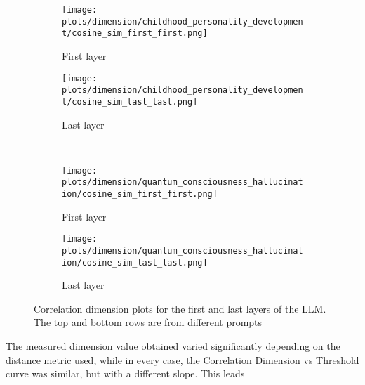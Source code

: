 \documentclass[a4paper,12pt]{article}
\begin{document}
\begin{figure}[H]
    \centering
    \begin{subfigure}[b]{0.48\linewidth}
        \centering
        \texttt{[image: plots/dimension/childhood\_personality\_development/cosine\_sim\_first\_first.png]}
        \caption{First layer}
    \end{subfigure}\hfill
    \begin{subfigure}[b]{0.48\linewidth}
        \centering
        \texttt{[image: plots/dimension/childhood\_personality\_development/cosine\_sim\_last\_last.png]}
        \caption{Last layer}
    \end{subfigure}
    \\[0.5em]
    \centering
    \begin{subfigure}[b]{0.48\linewidth}
        \centering
        \texttt{[image: plots/dimension/quantum\_consciousness\_hallucination/cosine\_sim\_first\_first.png]}
        \caption{First layer}
    \end{subfigure}\hfill
    \begin{subfigure}[b]{0.48\linewidth}
        \centering
        \texttt{[image: plots/dimension/quantum\_consciousness\_hallucination/cosine\_sim\_last\_last.png]}
        \caption{Last layer}
    \end{subfigure}
    \caption{Correlation dimension plots for the first and last layers of the LLM. The top and bottom rows are from different prompts}
    \label{fig:dim_first_last}
\end{figure}



The measured dimension value obtained varied significantly depending on the distance metric used, %
while in every case, the Correlation Dimension vs Threshold curve was similar, but with a different slope. This leads

\end{document}

